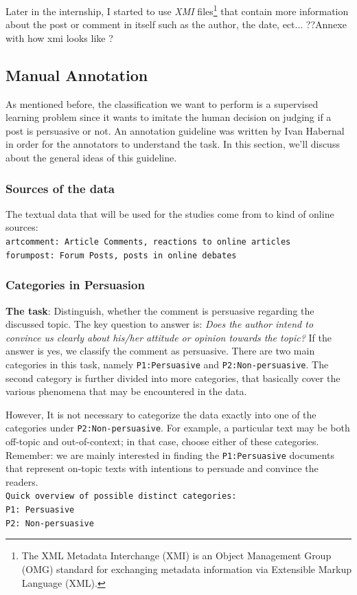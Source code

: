 Later in the internship, I started to use \textit{XMI} files\footnote{The XML Metadata Interchange (XMI) is an Object Management Group (OMG) standard for exchanging metadata information via Extensible Markup Language (XML).} that contain more information about the post or comment in itself such as the author, the date, ect... ??Annexe with how xmi looks like ?

\subsection{Manual Annotation}
As mentioned before, the classification we want to perform is a supervised learning problem since it wants to imitate the human decision on judging if a post is persuasive or not. An annotation guideline was written by Ivan Habernal \cite{ivanguideline} in order for the annotators to understand the task. In this section, we'll discuss about the general ideas of this guideline.
\subsubsection{Sources of the data}
The textual data that will be used for the studies come from to kind of online sources:
\\
\texttt{artcomment: Article Comments, reactions to online articles}
\\
\texttt{forumpost: Forum Posts, posts in online debates}
\subsubsection{Categories in Persuasion}
\textbf{The task}: Distinguish, whether the comment is persuasive regarding the discussed topic. The key question to answer is: \textit{Does the author intend to convince us clearly about his/her attitude or opinion towards the topic?} If the answer is yes, we classify the comment as persuasive. There are two main categories in this task, namely \texttt{P1:Persuasive} and \texttt{P2:Non-persuasive}. The second category is further divided into more categories, that basically cover the various phenomena that may be encountered in the data.

However, It is not necessary to categorize the data exactly into one of the categories under \texttt{P2:Non-persuasive}. For example, a particular text may be both off-topic and out-of-context; in that case, choose either of these categories.
\\
Remember: we are mainly interested in finding the \texttt{P1:Persuasive} documents that represent on-topic texts with intentions to persuade and convince the readers.
\vspace{0.1cm}
\\
\texttt{Quick overview of possible distinct categories:}
\\
\texttt{P1: Persuasive}
\\
\texttt{P2: Non-persuasive}

